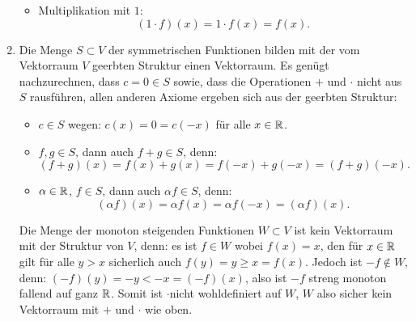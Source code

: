 \documentclass{theozettel}
\begin{document}
\begin{enumerate}
\begin{itemize}
				\item 	Multiplikation mit $1$:
						\[
							(1 \cdot f)(x) = 1 \cdot f(x) = f(x).
						\]
			\end{itemize}
	
	\item 	Die Menge $S \subset V$ der symmetrischen Funktionen bilden mit der vom Vektorraum $V$ geerbten Struktur einen Vektorraum. Es genügt nachzurechnen, dass $c = 0 \in S$ sowie, dass die Operationen $+$ und $\cdot$ nicht aus $S$ rausführen, allen anderen Axiome ergeben sich aus der geerbten Struktur:
			\begin{itemize}
				\item 	$c \in S$ wegen: $c(x) = 0 = c(-x)$ für alle $x \in \mathbb{R}$.
				
				\item 	$f,g \in S$, dann auch $f+g \in S$, denn:
						\[
							(f+g)(x) = f(x) + g(x) = f(-x) + g(-x) = (f+g)(-x).
						\]
				
				\item 	$\alpha \in \mathbb{R}$, $f \in S$, dann auch $\alpha f \in S$, denn:
						\[
							(\alpha f)(x) = \alpha f(x) = \alpha f(-x) = (\alpha f)(x).
						\]
			\end{itemize}
			Die Menge der monoton steigenden Funktionen $W \subset V$ ist kein Vektorraum mit der Struktur von $V$, denn: es ist $f \in W$ wobei $f(x) = x$, den für $x \in \mathbb{R}$ gilt für alle $y > x$ sicherlich auch $f(y) = y \geq x = f(x)$. Jedoch ist $-f \notin W$, denn: $(-f)(y) = -y < -x = (-f)(x)$, also ist $-f$ streng monoton fallend auf ganz $\mathbb{R}$. Somit ist $\cdot $nicht wohldefiniert auf $W$, $W$ also sicher kein Vektorraum mit $+$ und $\cdot $ wie oben.
\end{enumerate}
\end{document}
